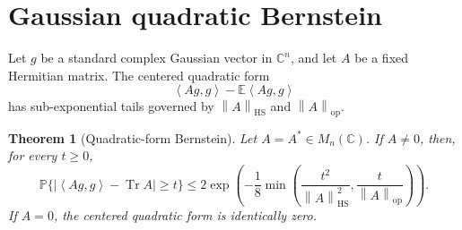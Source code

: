 \documentclass[11pt,oneside]{book}
\newtheorem{theorem}{Theorem}[chapter]
\DeclareMathOperator{\Tr}{Tr}
\newcommand{\C}{\mathbb C}
\newcommand{\E}{\mathbb E}
\newcommand{\Prob}{\mathbb P}
\newcommand{\1}{\mathbf 1}
\newcommand{\HS}{\mathrm{HS}}
\newcommand{\op}{\mathrm{op}}
\newcommand{\norm}[1]{\left\|#1\right\|}
\newcommand{\ip}[2]{\left\langle #1,#2\right\rangle}
\begin{document}
\section{Gaussian quadratic Bernstein}

Let \(g\) be a standard complex Gaussian vector in \(\C^n\), and let \(A\) be
a fixed Hermitian matrix.  The centered quadratic form
\[
  \ip{Ag}{g}-\E\ip{Ag}{g}
\]
has sub-exponential tails governed by \(\norm A_{\HS}\) and
\(\norm A_{\op}\).

\begin{theorem}[Quadratic-form Bernstein]
Let \(A=A^*\in M_n(\C)\).  If \(A\ne0\), then, for every \(t\ge0\),
\[
  \Prob\{|\ip{Ag}{g}-\Tr A|\ge t\}
  \le
  2\exp\left(
    -\frac18\min\left(\frac{t^2}{\norm A_{\HS}^2},
                \frac{t}{\norm A_{\op}}\right)
  \right).
\]
If \(A=0\), the centered quadratic form is identically zero.
\end{theorem}
\end{document}
